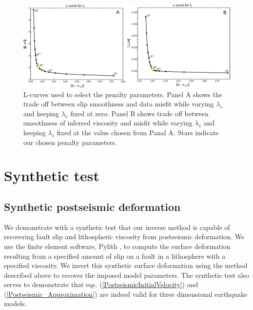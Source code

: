 \documentclass[extra,mreferee]{gji}
\begin{document}
\begin{figure}\label{figure2}
  \centering
  \includegraphics[scale=0.43]{FinalFigures/Figure6.pdf}
  \caption{L-curves used to select the penalty parameters. Panel A
    shows the trade off between slip smoothness and data misfit while
    varying $\lambda_s$ and keeping $\lambda_v$ fixed at zero.  Panel
    B shows trade off between smoothness of inferred viscosity and
    misfit while varying $\lambda_v$ and keeping $\lambda_s$ fixed at
    the value chosen from Panal A.  Stars indicate our chosen penalty
    parameters.}
  \label{Figure 2}
\end{figure}

\section{Synthetic test}
\subsection{Synthetic postseismic deformation}

We demonstrate with a synthetic test that our inverse method is
capable of recovering fault slip and lithospheric viscosity from
postseismic deformation.  We use the finite element software, Pylith
\citep{A2007}, to compute the surface deformation resulting from a
specified amount of slip on a fault in a lithosphere with a specified
viscosity.  We invert this synthetic surface deformation using the
method described above to recover the imposed model parameters.  The
synthetic test also serves to demonstrate that
eqs. (\ref{PostseismicInitialVelocity}) and
(\ref{Postseismic_Approximation}) are indeed valid for three
dimensional earthquake models.
\end{document}

